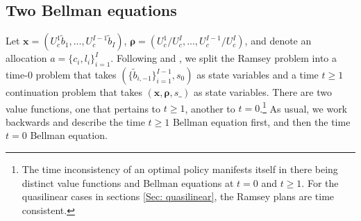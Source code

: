 \documentclass[thmsb,11pt]{article}
\begin{document}
\color{black}







\subsection{Two Bellman equations}\label{sec: two bellman equation}
Let $\bm{x}= \left( U_{c}^{1}\tilde{b}_{1},...,U_{c}^{I-1}\tilde{b}_{I}\right)$, $\bm{\rho }=\left( U_{c}^{1}/U_{c}^{I},...,U_{c}^{I-1}/U_{c}^{I}\right) $, and denote an allocation $a=\{c_i,l_i\}^{I}_{i=1}.$
Following \cite{Kydland1980} and \cite{Farhi2010}, we split the Ramsey problem into a time-$0$ problem that takes $(\{\tilde{b}_{i,-1}\}^{I-1}_{i=1}, s_0)$ as state variables
and   a time $t \geq 1$ continuation problem  that takes $(\bm x,\bm \rho,s\_)$ as state variables. There are
two value functions, one that pertains to $t\geq 1$, another to $t=0$.\footnote{The time inconsistency of an optimal policy
manifests itself in there being distinct value functions and Bellman equations at $t =0$ and $t \geq 1$. For the quasilinear cases in sections \ref{Sec: quasilinear}, the Ramsey plans are time consistent.}  As usual, we work backwards and describe the time $t \geq 1$ Bellman equation
first, and then the time $t=0$ Bellman equation.
\end{document}
